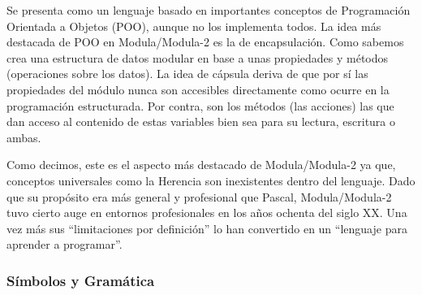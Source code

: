 Se presenta como un lenguaje basado en importantes conceptos de Programación
Orientada a Objetos (POO), aunque no los implementa todos. La idea más destacada
de POO en Modula/Modula-2 es la de encapsulación. Como sabemos crea una
estructura de datos modular en base a unas propiedades y métodos (operaciones
sobre los datos). La idea de cápsula deriva de que por sí las propiedades del
módulo nunca son accesibles directamente como ocurre en la programación
estructurada. Por contra, son los métodos (las acciones) las que dan acceso al
contenido de estas variables bien sea para su lectura, escritura o ambas.

Como decimos, este es el aspecto más destacado de Modula/Modula-2 ya que,
conceptos universales como la Herencia son inexistentes dentro del lenguaje.
Dado que su propósito era más general y profesional que Pascal, Modula/Modula-2
tuvo cierto auge en entornos profesionales en los años ochenta del siglo XX. Una
vez más sus ``limitaciones por definición'' lo han convertido en
un ``lenguaje para aprender a programar''.

\subsubsection{Símbolos y Gramática} 

